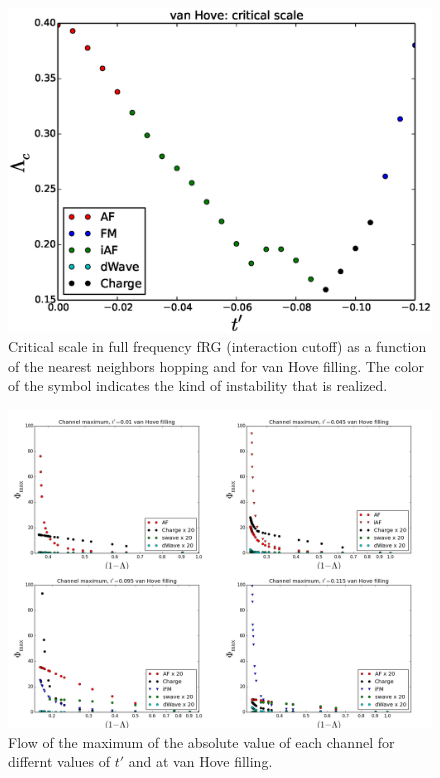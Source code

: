 \begin{figure}
\includegraphics[scale=0.5]{vanHove_scan_critical_lambda_phi.eps}
\caption{Critical scale in full frequency fRG (interaction cutoff) as a function of the nearest neighbors hopping and for van Hove filling. The color of the symbol indicates the kind of instability that is realized.  } \label{phasediag_van_hove}

\end{figure}


\begin{figure}
\includegraphics[scale=0.25]{images/vanhovelam.png}
\caption{Flow of the maximum of the absolute value of each channel for differnt values of $t'$ and at van Hove filling.
} 
\label{lamvan} 
\end{figure}


